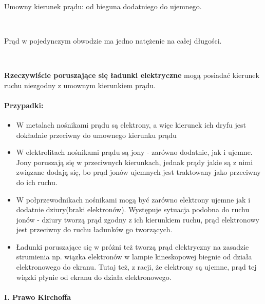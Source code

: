 \documentclass{article}
\begin{document}
            \

            Umowny kierunek prądu: od bieguna dodatniego do ujemnego.

            \

            Prąd w pojedynczym obwodzie ma jedno natężenie na całej długości.

            \
            
            \textbf{Rzeczywiście poruszające się ładunki elektryczne}
            mogą posiadać kierunek ruchu niezgodny z umownym kierunkiem
            prądu.

            \paragraph{Przypadki: }
            \begin{itemize}
                \item W metalach nośnikami prądu są elektrony, a więc
                kierunek ich dryfu jest dokładnie przeciwny do umownego
                kierunku prądu
                \item W elektrolitach nośnikami prądu są jony -
                zarówno dodatnie, jak i ujemne. Jony poruszają się w
                przeciwnych kierunkach, jednak prądy jakie są z nimi
                związane dodają się, bo prąd jonów ujemnych jest
                traktowany jako przeciwny do ich ruchu.
                \item W połprzewodnikach nośnikami mogą być zarówno
                elektrony ujemne jak i dodatnie dziury(braki elektronów).
                Występuje sytuacja podobna do ruchu jonów - dziury tworzą
                prąd zgodny z ich kierunkiem ruchu, prąd elektronowy jest
                przeciwny do ruchu ładunków go tworzących.
                \item Ładunki poruszające się w próżni też tworzą prąd elektryczny
                na zasadzie strumienia np. wiązka elektronów w lampie kineskopowej
                biegnie od działa elektronowego do ekranu. Tutaj też, z racji,
                że elektrony są ujemne, prąd tej wiązki płynie od ekranu do
                działa elektronowego.
            \end{itemize}

            \paragraph{I. Prawo Kirchoffa}
            
\end{document}
